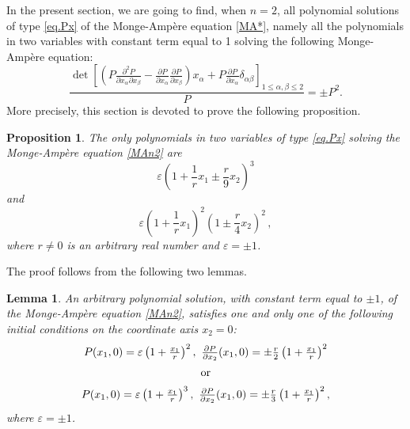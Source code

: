 \documentclass[11pt, reqno]{amsart}
\newtheorem{prop}[theor]{Proposition}
\newtheorem{lem}[theor]{Lemma}
\newcommand{\de}{\partial}
\newcommand{\e}{\varepsilon}
\begin{document}
\noindent
In the present section, we are going to find,  when $n=2$, all polynomial solutions of type \eqref{eq.Px} of the Monge-Ampère equation \eqref{MA*}, namely all the polynomials in two variables with constant term equal to 1 solving the following Monge-Ampère equation:
\begin{equation}\label{MAn2}
\frac{\det\left[\left(P \frac{\partial^2 P}{\partial{x_\alpha}\partial{x_\beta}}-\frac{\partial P}{\partial{x_\alpha}}\frac{\partial P}{\partial{x_\beta}}\right)x_\alpha+P\frac{\partial P}{\partial{x_\alpha}} \delta_{\alpha\beta}\right]_{1\leq\alpha,\beta\leq 2}}{P}=\pm P^{2}.
\end{equation}
More precisely, this section is devoted to prove the following proposition.
\begin{prop} \label{newmain}
The only polynomials in two variables of type  \eqref{eq.Px} solving the  Monge-Amp\`ere equation
\eqref{MAn2}
 are
\begin{equation}\label{solution1}
\e\left(1+\frac{1}{r}x_1\pm\frac{r}{9}x_2 \right)^3
\end{equation}
and
\begin{equation}\label{solution2}
\e\left(1+ \frac{1}{r}x_1\right)^2 \left(1\pm\frac{r}{4}x_2\right)^2\,,
\end{equation}
where $r\neq 0$ is an arbitrary real number and $\e=\pm1$.
\end{prop}




\noindent
The proof  follows from the following two lemmas.
\begin{lem}\label{Cauchydata}
An arbitrary polynomial solution, with constant term equal to $\pm1$, of the Monge-Amp\`ere equation  \eqref{MAn2}, satisfies  one and only one of the following initial conditions on the coordinate axis $x_2=0$:
\begin{equation}\label{Cauchy}
\begin{array}{c}
P(x_1,0)=\e\left(1+\frac{x_1}{r}\right)^2,\ \frac{\de P}{\de x_2}(x_1,0)=\pm\frac{r}{2}\left(1+\frac{x_1}{r}\right)^2 \vspace{0,2cm} \\
\vspace{0,2cm}
 \text{ or } \\
P(x_1,0)=\e\left(1+\frac{x_1}{r}\right)^3,\ \frac{\de P}{\de x_2}(x_1,0)=\pm\frac{r}{3}\left(1+\frac{x_1}{r}\right)^2,\\
\end{array}
\end{equation}
where $\e=\pm1$.
\end{lem}
\end{document}
